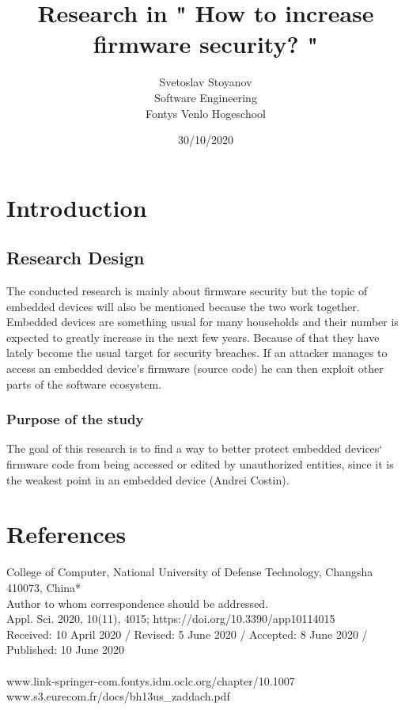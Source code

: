 \documentclass[]{report}
\begin{document}
\title{Research in " How to increase firmware security? " }
\author{Svetoslav Stoyanov \\
	Software Engineering \\
	Fontys Venlo Hogeschool}
\date {30/10/2020}
\maketitle

\tableofcontents
\chapter{Introduction}
\section{Research Design}
The conducted research is mainly about firmware security but the topic of embedded devices will also be mentioned because the two work together.
Embedded devices are something usual for many households and their number is expected to greatly increase in the next few years. Because of that they have lately become the usual target for security breaches. If an attacker manages to access an embedded device's firmware (source code) he can then exploit other parts of the software ecosystem.

\subsection{Purpose of the study} 
The goal of this research is to find a way to better protect embedded devices` firmware code from being accessed or edited by unauthorized entities, since it is the weakest point in an embedded device (Andrei Costin).
\chapter{References}

College of Computer, National University of Defense Technology, Changsha 410073, China* \\

Author to whom correspondence should be addressed. \\
Appl. Sci. 2020, 10(11), 4015; https://doi.org/10.3390/app10114015 \\
Received: 10 April 2020 / Revised: 5 June 2020 / Accepted: 8 June 2020 / Published: 10 June 2020 \\
\\
www.link-springer-com.fontys.idm.oclc.org/chapter/10.1007%
\\
www.s3.eurecom.fr/docs/bh13us\_zaddach.pdf
\end{document}
